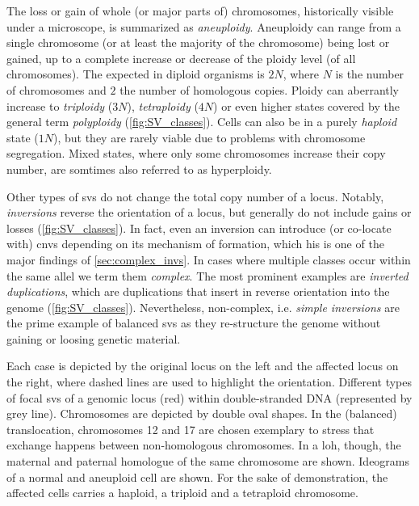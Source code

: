 The loss or gain of whole (or major parts of) chromosomes, historically visible
under a microscope, is summarized as \emph{aneuploidy}.
Aneuploidy can range from a single chromosome (or at least the majority of the
chromosome) being lost or gained, up to a complete increase or decrease of the
ploidy level (of all chromosomes). The expected 
in diploid organisms is $2N$, where $N$ is the number of chromosomes and $2$ the
number of homologous copies. Ploidy can aberrantly increase to \emph{triploidy}
($3N$), \emph{tetraploidy} ($4N$) or even higher states covered by the general term
\emph{polyploidy} (\cref{fig:SV_classes}). Cells can also be in a purely \emph{haploid} state ($1N$),
but they are rarely viable due to problems with chromosome segregation. Mixed
states, where only some chromosomes increase their copy number, are somtimes
also referred to as hyperploidy.

Other types of \acp{sv} do not change the total copy number of a locus. Notably,
\emph{inversions} reverse the orientation of a locus, but generally do not
include gains or losses (\cref{fig:SV_classes}). In fact, even an inversion can
introduce (or co-locate with) \acp{cnv} depending on its mechanism of formation,
which his is one of the major findings of \cref{sec:complex_invs}.
In cases where multiple \sv classes occur within the same allel we term them
\emph{complex}. The most prominent examples are \emph{inverted duplications},
which are duplications that insert in reverse orientation into the genome
(\cref{fig:SV_classes}). Nevertheless, non-complex, i.e. \emph{simple inversions}
are the prime example of balanced \acp{sv} as they re-structure the genome
without gaining or loosing genetic material.

    {Each case is depicted by the original locus on the left and the affected
    locus on the right, where dashed lines are used to highlight the orientation.
     Different types of focal \acp{sv} of a genomic locus (red)
    within double-stranded DNA (represented by grey line).  
    Chromosomes are depicted by double oval shapes. In the (balanced)
    translocation, chromosomes 12 and 17 are chosen exemplary to stress that
    exchange happens between non-homologous chromosomes. In a \acl{loh},
    though, the maternal and paternal homologue of the same chromosome are
    shown.  Ideograms of a normal and aneuploid cell are shown.
    For the sake of demonstration, the affected cells carries a haploid,
    a triploid and a tetraploid chromosome.}

